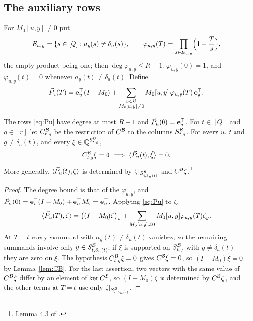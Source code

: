 \subsection{The auxiliary rows}
For $M_0[u,y]\ne0$ put
\begin{equation}\label{eq:phi}
  E_{u,y}=\{s\in[Q]:a_y(s)\ne\delta_u(s)\},\qquad
  \varphi_{u,y}(T)=\prod_{s\in E_{u,y}}\Bigl(1-\frac Ts\Bigr),
\end{equation}
the empty product being one; then $\deg\varphi_{u,y}\le R-1$, $\varphi_{u,y}(0)=1$,
and $\varphi_{u,y}(t)=0$ whenever $a_y(t)\ne\delta_u(t)$. Define
\begin{equation}\label{eq:Pu}
  \vec{P}_u(T)=\mathbf{e}_u^{\top}(I-M_0)+\sum_{\substack{y\in\mathcal{B}\\ M_0[u,y]\ne0}}M_0[u,y]\,\varphi_{u,y}(T)\,\mathbf{e}_y^{\top}.
\end{equation}

\begin{lemma}\label{lem:rows}
The rows \eqref{eq:Pu} have degree at most $R-1$ and $\vec{P}_u(0)=\mathbf{e}_u^{\top}$. For
$t\in[Q]$ and $g\in[r]$ let $C^{\mathcal{B}}_{t,g}$ be the restriction of $C^{\mathcal{B}}$ to the
columns $S^{\mathcal{B}}_{t,g}$. For every $u$, $t$ and $g\ne\delta_u(t)$, and every
$\xi\in\mathbb{Q}^{S^{\mathcal{B}}_{t,g}}$,
\[
  C^{\B}_{t,g}\xi=0\ \Longrightarrow\ \ip{\PP_u(t)}{\tilde\xi}=0 .
\]
More generally, $\langle \vec{P}_u(t),\zeta\rangle$ is determined by $\zeta|_{S^{\mathcal{B}}_{t,\delta_u(t)}}$
and $C^{\mathcal{B}}\zeta$.\footnote{Lemma 4.3 of \cite{OAI26}.}
\end{lemma}

\begin{proof}
The degree bound is that of the $\varphi_{u,y}$, and
$\vec{P}_u(0)=\mathbf{e}_u^{\top}(I-M_0)+\mathbf{e}_u^{\top}M_0=\mathbf{e}_u^{\top}$. Applying
\eqref{eq:Pu} to $\zeta$,
\begin{equation}\label{eq:Puzeta}
  \langle \vec{P}_u(T),\zeta\rangle=\bigl((I-M_0)\zeta\bigr)_u+\sum_{M_0[u,y]\ne0}M_0[u,y]\varphi_{u,y}(T)\zeta_y .
\end{equation}
At $T=t$ every summand with $a_y(t)\ne\delta_u(t)$ vanishes, so the remaining
summands involve only $y\in S^{\mathcal{B}}_{t,\delta_u(t)}$; if $\tilde\xi$ is supported on
$S^{\mathcal{B}}_{t,g}$ with $g\ne\delta_u(t)$ they are zero on $\tilde\xi$. The hypothesis
$C^{\mathcal{B}}_{t,g}\xi=0$ gives $C^{\mathcal{B}}\tilde\xi=0$, so $(I-M_0)\tilde\xi=0$ by
Lemma~\ref{lem:CB}. For the last assertion, two vectors with the same value of
$C^{\mathcal{B}}\zeta$ differ by an element of $\ker C^{\mathcal{B}}$, so $(I-M_0)\zeta$ is
determined by $C^{\mathcal{B}}\zeta$, and the other terms at $T=t$ use only
$\zeta|_{S^{\mathcal{B}}_{t,\delta_u(t)}}$.
\end{proof}

